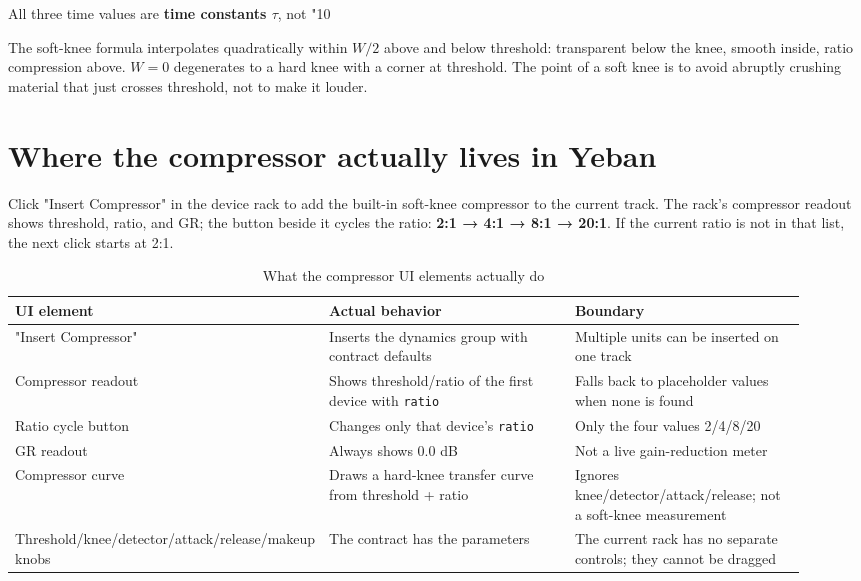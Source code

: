 All three time values are \textbf{time constants $\tau$}, not "10%

The soft-knee formula interpolates quadratically within $W/2$ above and below threshold: transparent below the knee, smooth inside, ratio compression above. $W=0$ degenerates to a hard knee with a corner at threshold. The point of a soft knee is to avoid abruptly crushing material that just crosses threshold, not to make it louder.

\section{Where the compressor actually lives in Yeban}

Click "Insert Compressor" in the device rack to add the built-in soft-knee compressor to the current track. The rack's compressor readout shows threshold, ratio, and GR; the button beside it cycles the ratio: \textbf{2:1 → 4:1 → 8:1 → 20:1}. If the current ratio is not in that list, the next click starts at 2:1.

\begin{table}[htbp]
\centering
\small
\begin{tabular}{@{}p{0.28\linewidth}p{0.34\linewidth}p{0.30\linewidth}@{}}
\hline
UI element & Actual behavior & Boundary \\
\hline
"Insert Compressor" & Inserts the dynamics group with contract defaults & Multiple units can be inserted on one track \\
Compressor readout & Shows threshold/ratio of the first device with \texttt{ratio} & Falls back to placeholder values when none is found \\
Ratio cycle button & Changes only that device's \texttt{ratio} & Only the four values 2/4/8/20 \\
GR readout & Always shows 0.0 dB & Not a live gain-reduction meter \\
Compressor curve & Draws a hard-knee transfer curve from threshold + ratio & Ignores knee/\allowbreak detector/\allowbreak attack/\allowbreak release; not a soft-knee measurement \\
Threshold/\allowbreak knee/\allowbreak detector/\allowbreak attack/\allowbreak release/\allowbreak makeup knobs & The contract has the parameters & The current rack has no separate controls; they cannot be dragged \\
\hline
\end{tabular}
\caption{What the compressor UI elements actually do}
\label{tab:comp-ui}
\end{table}

